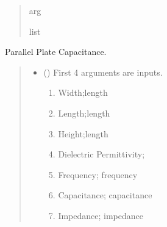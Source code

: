 \documentclass[letterpaper,10pt,english]{sphinxmanual}
\begin{document}
\begin{fulllineitems}
\begin{quote}
\begin{description}
\begin{itemize}
\end{itemize}

\sphinxAtStartPar
arg

\sphinxAtStartPar
list

\end{description}\end{quote}

\end{fulllineitems}


\begin{fulllineitems}
\label{\detokenize{components:components.ParallelPlateCap}}
\pysigstartsignatures
{}
\pysigstopsignatures
\sphinxAtStartPar
Parallel Plate Capacitance.
\begin{quote}\begin{description}
\begin{itemize}
\item {} 
\sphinxAtStartPar
{} () \textendash{} 
\sphinxAtStartPar
First 4 arguments are inputs.
\begin{enumerate}
%
\item {} 
\sphinxAtStartPar
Width;length

\item {} 
\sphinxAtStartPar
Length;length

\item {} 
\sphinxAtStartPar
Height;length

\item {} 
\sphinxAtStartPar
Dielectric Permittivity;

\item {} 
\sphinxAtStartPar
Frequency; frequency

\item {} 
\sphinxAtStartPar
Capacitance; capacitance

\item {} 
\sphinxAtStartPar
Impedance; impedance

\end{enumerate}



\end{itemize}
\end{description}
\end{quote}
\end{fulllineitems}
\end{document}
